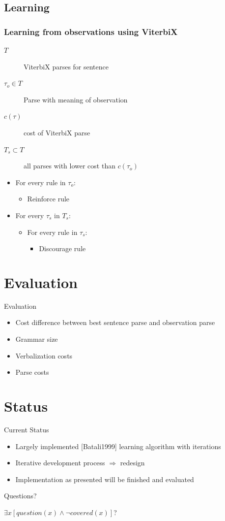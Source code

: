 \documentclass[11pt,a4paper,xcolor=dvipsnames]{beamer}
\begin{document}
\subsection{Learning}
\begin{frame} %
\frametitle{Learning from observations using ViterbiX}
\begin{description}
  \item[$T$] ViterbiX parses for sentence
  \item[$\tau_o \in T$] Parse with meaning of observation
  \item[$c(\tau)$] cost of ViterbiX parse
  \item[$T_s \subset T$] all parses with lower cost than $c(\tau_o)$
\end{description}

\begin{itemize}
\item For every rule in $\tau_o$:
    \begin{itemize}
      \item Reinforce rule
    \end{itemize}
  \item For every $\tau_s$ in $T_s$:
    \begin{itemize}
      \item For every rule in $\tau_s$:
        \begin{itemize}
          \item Discourage rule
        \end{itemize}
    \end{itemize}
\end{itemize}
\end{frame}

\section{Evaluation}
\begin{frame}{Evaluation} %
\begin{itemize}
  \item Cost difference between best sentence parse and observation parse
  \item Grammar size
  \item Verbalization costs
  \item Parse costs
\end{itemize}
\end{frame}

\section{Status} %
\begin{frame}{Current Status}
  \begin{itemize}
    \item Largely implemented [Batali1999] learning algorithm with iterations
    \item Iterative development process $\Rightarrow$ redesign
    \item Implementation as presented will be finished and evaluated
  \end{itemize}
\end{frame}

\begin{frame}{Questions?}
  \begin{center}
  {\Large $\exists x \left[ question(x) \land \neg covered(x) \right]$?}
\end{center}
\end{frame}
\end{document}
